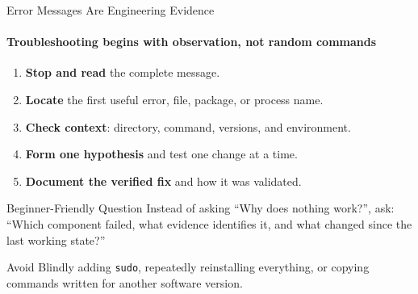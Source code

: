 \begin{frame}{Error Messages Are Engineering Evidence}
\framesubtitle{Troubleshooting begins with observation, not random commands}

\begin{enumerate}
    \item \textbf{Stop and read} the complete message.
    \item \textbf{Locate} the first useful error, file, package, or process name.
    \item \textbf{Check context}: directory, command, versions, and environment.
    \item \textbf{Form one hypothesis} and test one change at a time.
    \item \textbf{Document the verified fix} and how it was validated.
\end{enumerate}

\pause

\begin{exampleblock}{Beginner-Friendly Question}
    Instead of asking ``Why does nothing work?'', ask:
    ``Which component failed, what evidence identifies it, and what changed
    since the last working state?''
\end{exampleblock}

\begin{alertblock}{Avoid}
    Blindly adding \texttt{sudo}, repeatedly reinstalling everything,
    or copying commands written for another software version.
\end{alertblock}
\end{frame}





